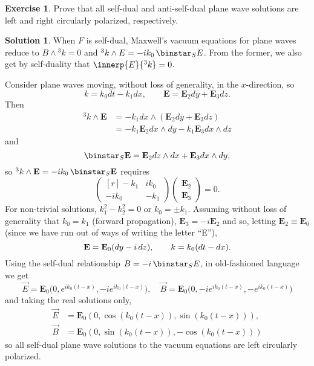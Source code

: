 \documentclass[11pt, a4paper]{report}
\theoremstyle{definition}
\newtheorem{exercise}{Exercise}[part]
\newtheorem{solution}{Solution}[part]
\newenvironment{ex}{\begin{exercise}}{\end{exercise}\pagebreak[1]}
\newenvironment{sol}{\begin{solution}}{\end{solution}\pagebreak[3]}
\newcommand*{\op}[1]{\ensuremath\mathop{}\mathopen{}#1}
\renewcommand*{\d}{\op{d}}
\renewcommand*{\star}{\op{\binstar}\mathord{}}
\begin{document}
\begin{ex}

Prove that all self-dual and anti-self-dual plane wave solutions are left and right circularly polarized, respectively.

\end{ex}

\begin{sol}

When $F$ is self-dual, Maxwell's vacuum equations for plane waves reduce to $B \wedge {}^3 k = 0$ and $^3 k \wedge E = -ik_0 \star_S E$. From the former, we also get by self-duality that $\innerp{E}{{}^3 k} = 0$.

Consider plane waves moving, without loss of generality, in the $x$-direction, so
\[
    k = k_0 dt - k_1 dx, \qquad
    \mathbf{E} = \mathbf{E}_2 dy + \mathbf{E}_3 dz.
\]
Then
\begin{align*}
    ^3 k \wedge \mathbf{E} &= -k_1 dx \wedge (\mathbf{E}_2 dy + \mathbf{E}_3 dz) \\
        &= -k_1 \mathbf{E}_2 dx \wedge dy - k_1 \mathbf{E}_3 dx \wedge dz
\end{align*}
and
\[
    \star_S \mathbf{E} = \mathbf{E}_2 dz \wedge dx + \mathbf{E}_3 dx \wedge dy,
\]
so $^3 k \wedge \mathbf{E} = -ik_0 \star_S \mathbf{E}$ requires
\[
    \begin{pmatrix*}[r]
        -k_1  & ik_0 \\
        -ik_0 & -k_1
    \end{pmatrix*}
    \begin{pmatrix}
        \mathbf{E}_2 \\ \mathbf{E}_3
    \end{pmatrix}
    = 0.
\]
For non-trivial solutions, $k_1^2 - k_2^2 = 0$ or $k_0 = \pm k_1$. Assuming without loss of generality that $k_0 = k_1$ (forward propagation), $\mathbf{E}_3 = -i \mathbf{E}_2$ and so, letting $\mathbf{E}_2 \equiv \mathbf{E}_0$ (since we have run out of ways of writing the letter ``E''),
\[
    \mathbf{E} = \mathbf{E}_0 (dy -i \d z), \qquad
    k = k_0 (dt - dx).
\]
Using the self-dual relationship $B = -i \star_S E$, in old-fashioned language we get
\[
    \vec{E} = \mathbf{E}_0 \bigl( 0, e^{ik_0 (t - x)}, -ie^{ik_0 (t - x)} \bigr), \quad
    \vec{B} = \mathbf{E}_0 \bigl( 0, -ie^{ik_0 (t - x)}, -e^{ik_0 (t - x)} \bigr)
\]
and taking the real solutions only,
\begin{align*}
    \vec{E} &= \mathbf{E}_0 (0, \cos(k_0 (t - x)), \sin(k_0 (t - x))), \\
    \vec{B} &= \mathbf{E}_0 (0, \sin(k_0 (t - x)), -\cos(k_0 (t - x)))
\end{align*}
so all self-dual plane wave solutions to the vacuum equations are left circularly polarized.


\end{sol}
\end{document}
